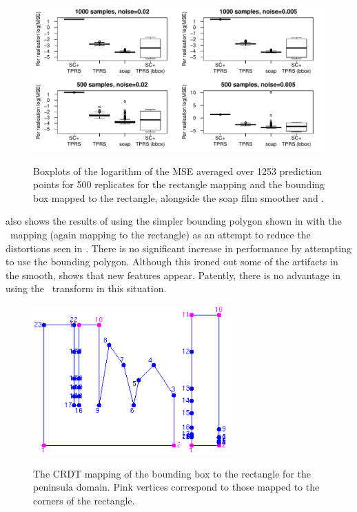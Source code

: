 \begin{figure}[p]
\centering
\includegraphics[width=6in]{sc/figs/wigglytop2-boxplot.pdf} \\
\caption{Boxplots of the logarithm of the MSE averaged over 1253 prediction points for 500 replicates for the rectangle mapping and the bounding box mapped to the rectangle, alongside the soap film smoother and \tprs.}
\label{wigglytop2-boxplots}
\end{figure}


 also shows the results of using the simpler bounding polygon shown in  with the \sch\ mapping (again mapping to the rectangle) as  an attempt to reduce the distortions seen in . There is no significant increase in performance by attempting to use the bounding polygon. Although this ironed out some of the artifacts in the smooth,  shows that new features appear. Patently, there is no advantage in using the \sch\ transform in this situation.



\begin{figure}
\centering
\includegraphics[width=3in]{sc/figs/wigglytop2-bbox-numbered.png} \\
\caption{The CRDT mapping of the bounding box to the rectangle for the peninsula domain. Pink vertices correspond to those mapped to the corners of the rectangle.}
\label{wigglytop2-bbox-numbered}
\end{figure}


